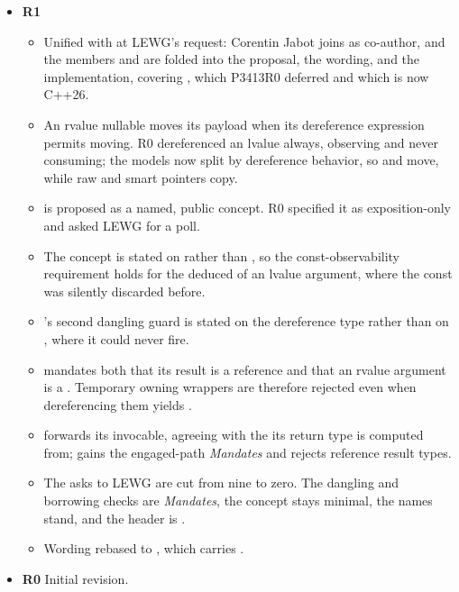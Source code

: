 \documentclass[a4paper,10pt,oneside,openany,final,article]{memoir}
\begin{document}
\begin{itemize}
\item \textbf{R1}
  \begin{itemize}
  \item Unified with \cite{P3413R0} at LEWG's request: Corentin Jabot joins as
    co-author, and the members  and
     are folded into the proposal, the wording, and the
    implementation, covering , which P3413R0 deferred and
    which is now C++26.
  \item An rvalue nullable moves its payload when its dereference expression
    permits moving. R0 dereferenced an lvalue always, observing and never
    consuming; the models now split by dereference behavior, so
     and  move, while raw and smart pointers
    copy.
  \item {} is proposed as a named, public concept. R0 specified
    it as exposition-only and asked LEWG for a poll.
  \item The concept is stated on  rather
    than , so the const-observability requirement holds for the
    deduced  of an lvalue argument, where the const was silently
    discarded before.
  \item {}'s second dangling guard is stated on the
    dereference type rather than on , where it could never fire.
  \item {} mandates both that its result is a reference and
    that an rvalue argument is a . Temporary owning
    wrappers are therefore rejected even when dereferencing them yields
    .
  \item {} forwards its invocable, agreeing with the
     its return type is computed from;
     gains the engaged-path \emph{Mandates} and rejects
    reference result types.
  \item The asks to LEWG are cut from nine to zero. The dangling and borrowing
    checks are \emph{Mandates}, the concept stays minimal, the names stand,
    and the header is .
  \item Wording rebased to \cite{N5054}, which carries
    .
  \end{itemize}
\item \textbf{R0} Initial revision.
\end{itemize}
\end{document}
